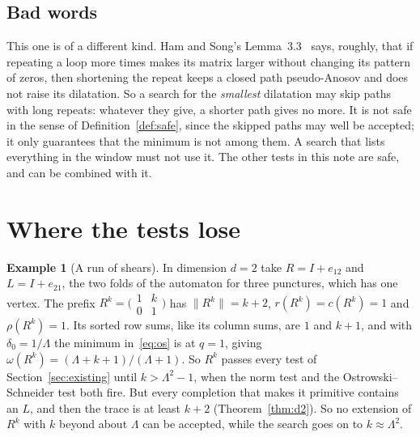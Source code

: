 \documentclass[11pt]{amsart}
\newcommand{\Lam}{\Lambda}
\newcommand{\nrm}[1]{\lVert #1\rVert}
\theoremstyle{plain}
\theoremstyle{definition}
\newtheorem{Example}[Theorem]{Example}
\begin{document}
\subsection{Bad words}

This one is of a different kind.  Ham and Song's
Lemma~3.3~\cite{HamSong} says, roughly, that if repeating a loop more
times makes its matrix larger without changing its pattern of zeros, then
shortening the repeat keeps a closed path pseudo-Anosov and does not raise
its dilatation.  So a search for the \emph{smallest} dilatation may skip
paths with long repeats: whatever they give, a shorter path gives no more.
It is not safe in the sense of Definition~\ref{def:safe}, since the
skipped paths may well be accepted; it only guarantees that the minimum is
not among them.  A search that lists everything in the window must not use
it.  The other tests in this note are safe, and can be combined with it.

\section{Where the tests lose}
\label{sec:lose}

\begin{Example}[A run of shears]
  \label{ex:shear}
  In dimension $d=2$ take $R=I+e_{12}$ and $L=I+e_{21}$, the two folds of
  the automaton for three punctures, which has one vertex.  The prefix
  $R^k=\bigl(\begin{smallmatrix}1&k\\0&1\end{smallmatrix}\bigr)$ has
  $\nrm{R^k}=k+2$, $r(R^k)=c(R^k)=1$ and $\rho(R^k)=1$.  Its sorted row
  sums, like its column sums, are $1$ and $k+1$, and with $\delta_0=1/\Lam$
  the minimum in~\eqref{eq:os} is at $q=1$, giving
  $\omega(R^k)=(\Lam+k+1)/(\Lam+1)$.  So $R^k$ passes every test of
  Section~\ref{sec:existing} until $k>\Lam^2-1$, when the norm test and the
  Ostrowski--Schneider test both fire.  But every completion that makes
  it primitive contains an $L$, and then the trace is at least $k+2$
  (Theorem~\ref{thm:d2}).  So no extension of $R^k$ with $k$ beyond about
  $\Lam$ can be accepted, while the search goes on to $k\approx\Lam^2$.
\end{Example}
\end{document}
